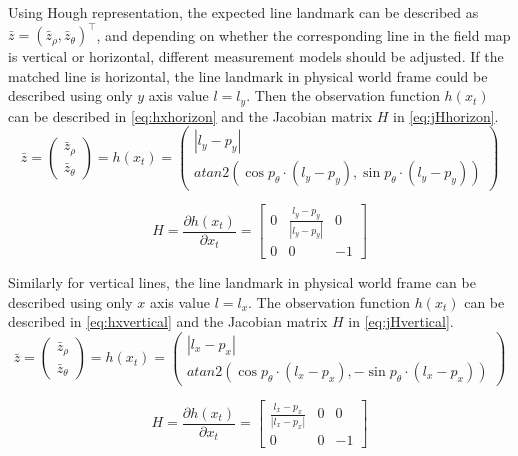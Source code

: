 Using Hough representation, the expected line landmark can be described as $\bar{z} = (\bar{z}_{\rho}, \bar{z}_{\theta})^\top$, and depending on whether the corresponding line in the field map is vertical or horizontal, different measurement models should be adjusted. If the matched line is horizontal, the line landmark in physical world frame could be described using only $y$ axis value $l = l_{y}$. Then the observation function $h(x_t)$ can be described in \autoref{eq:hxhorizon} and the Jacobian matrix $H$ in \autoref{eq:jHhorizon}. \\
\begin{equation}\label{eq:hxhorizon}
  \bar{z} = \begin{pmatrix}
\bar{z}_{\rho}\\ 
\bar{z}_{\theta}
\end{pmatrix}
= 
h(x_t)
=
\begin{pmatrix}
|l_{y}-p_{y}| \\
atan2(\cos{p_{\theta}\cdot (l_y-p_y)}, \sin{p_{\theta}}\cdot (l_y-p_y))
\end{pmatrix}
\end{equation}

\begin{equation}\label{eq:jHhorizon}
H =
\frac{\partial h(x_t)}{\partial x_t}
=
\begin{bmatrix}
  0 & \frac{l_{y}-p_{y}}{|l_{y}-p_{y}|} & 0 \\ 
  0 & 0 & -1 
\end{bmatrix}
\end{equation}

Similarly for vertical lines, the line landmark in physical world frame can be described using only $x$ axis value $l = l_{x}$. The observation function $h(x_t)$ can be described in \autoref{eq:hxvertical} and the Jacobian matrix $H$ in \autoref{eq:jHvertical}. \\
\begin{equation}\label{eq:hxvertical}
  \bar{z} = \begin{pmatrix}
\bar{z}_{\rho}\\ 
\bar{z}_{\theta}
\end{pmatrix}
= 
h(x_t)
=
\begin{pmatrix}
|l_{x}-p_{x}| \\
atan2(\cos{p_{\theta}\cdot (l_x-p_x)}, -\sin{p_{\theta}}\cdot (l_x-p_x))
\end{pmatrix}
\end{equation}

\begin{equation}\label{eq:jHvertical}
H =
\frac{\partial h(x_t)}{\partial x_t}
=
\begin{bmatrix}
  \frac{l_{x}-p_{x}}{|l_{x}-p_{x}|} & 0 & 0\\ 
  0 & 0 & -1 
\end{bmatrix}
\end{equation}

